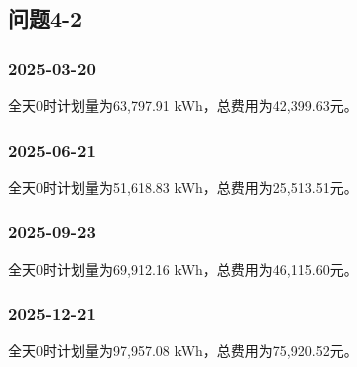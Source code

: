 \subsection{问题4-2}
\noindent\begin{minipage}{\linewidth}
\subsubsection*{2025-03-20}


全天0时计划量为63,797.91 kWh，总费用为42,399.63元。


\end{minipage}
\par\medskip
\noindent\begin{minipage}{\linewidth}
\subsubsection*{2025-06-21}


全天0时计划量为51,618.83 kWh，总费用为25,513.51元。


\end{minipage}
\par\medskip
\noindent\begin{minipage}{\linewidth}
\subsubsection*{2025-09-23}


全天0时计划量为69,912.16 kWh，总费用为46,115.60元。


\end{minipage}
\par\medskip
\noindent\begin{minipage}{\linewidth}
\subsubsection*{2025-12-21}


全天0时计划量为97,957.08 kWh，总费用为75,920.52元。


\end{minipage}
\par\medskip


